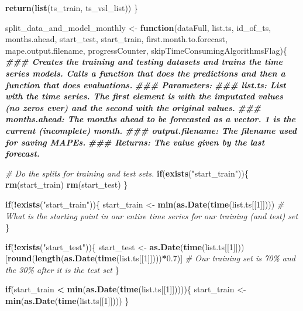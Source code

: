 \documentclass[
]{article}
\newenvironment{Shaded}{\begin{snugshade}}{\end{snugshade}}
\newcommand{\CommentTok}[1]{\textcolor[rgb]{0.56,0.35,0.01}{\textit{#1}}}
\newcommand{\ControlFlowTok}[1]{\textcolor[rgb]{0.13,0.29,0.53}{\textbf{#1}}}
\newcommand{\DecValTok}[1]{\textcolor[rgb]{0.00,0.00,0.81}{#1}}
\newcommand{\DocumentationTok}[1]{\textcolor[rgb]{0.56,0.35,0.01}{\textbf{\textit{#1}}}}
\newcommand{\FloatTok}[1]{\textcolor[rgb]{0.00,0.00,0.81}{#1}}
\newcommand{\FunctionTok}[1]{\textcolor[rgb]{0.13,0.29,0.53}{\textbf{#1}}}
\newcommand{\NormalTok}[1]{#1}
\newcommand{\OtherTok}[1]{\textcolor[rgb]{0.56,0.35,0.01}{#1}}
\newcommand{\SpecialCharTok}[1]{\textcolor[rgb]{0.81,0.36,0.00}{\textbf{#1}}}
\newcommand{\StringTok}[1]{\textcolor[rgb]{0.31,0.60,0.02}{#1}}
\begin{document}
\begin{Shaded}
\begin{Highlighting}[]
  \FunctionTok{return}\NormalTok{(}\FunctionTok{list}\NormalTok{(ts\_train, ts\_vsl\_list))}
\NormalTok{\}}


\NormalTok{split\_data\_and\_model\_monthly }\OtherTok{\textless{}{-}} \ControlFlowTok{function}\NormalTok{(dataFull, list.ts, id\_of\_ts, months.ahead, start\_test, start\_train, first.month.to.forecast, mape.output.filename, progressCounter, skipTimeConsumingAlgorithmsFlag)\{}
\DocumentationTok{\#\#\# Creates the training and testing datasets and trains the time series models. Calls a function that does the predictions and then a function that does evaluations.}
\DocumentationTok{\#\#\# Parameters:}
\DocumentationTok{\#\#\# list.ts: List with the time series. The first element is with the imputated values (no zeros ever) and the second with the original values.}
\DocumentationTok{\#\#\# months.ahead: The months ahead to be forecasted as a vector. 1 is the current (incomplete) month.}
\DocumentationTok{\#\#\# output.filename: The filename used for saving MAPEs.}
\DocumentationTok{\#\#\# Returns: The value given by the last forecast.}

  \CommentTok{\# Do the splits for training and test sets.}
  \ControlFlowTok{if}\NormalTok{(}\FunctionTok{exists}\NormalTok{(}\StringTok{"start\_train"}\NormalTok{))\{}
    \FunctionTok{rm}\NormalTok{(start\_train)}
    \FunctionTok{rm}\NormalTok{(start\_test)}
\NormalTok{  \}}

  \ControlFlowTok{if}\NormalTok{(}\SpecialCharTok{!}\FunctionTok{exists}\NormalTok{(}\StringTok{"start\_train"}\NormalTok{))\{}
\NormalTok{    start\_train }\OtherTok{\textless{}{-}} \FunctionTok{min}\NormalTok{(}\FunctionTok{as.Date}\NormalTok{(}\FunctionTok{time}\NormalTok{(list.ts[[}\DecValTok{1}\NormalTok{]]))) }\CommentTok{\# What is the starting point in our entire time series for our training (and test) set}
\NormalTok{  \}}

  \ControlFlowTok{if}\NormalTok{(}\SpecialCharTok{!}\FunctionTok{exists}\NormalTok{(}\StringTok{"start\_test"}\NormalTok{))\{}
\NormalTok{    start\_test }\OtherTok{\textless{}{-}} \FunctionTok{as.Date}\NormalTok{(}\FunctionTok{time}\NormalTok{(list.ts[[}\DecValTok{1}\NormalTok{]]))[}\FunctionTok{round}\NormalTok{(}\FunctionTok{length}\NormalTok{(}\FunctionTok{as.Date}\NormalTok{(}\FunctionTok{time}\NormalTok{(list.ts[[}\DecValTok{1}\NormalTok{]])))}\SpecialCharTok{*}\FloatTok{0.7}\NormalTok{)] }\CommentTok{\# Our training set is 70\% and the 30\% after it is the test set}
\NormalTok{  \}}
  
  \ControlFlowTok{if}\NormalTok{(start\_train }\SpecialCharTok{\textless{}} \FunctionTok{min}\NormalTok{(}\FunctionTok{as.Date}\NormalTok{(}\FunctionTok{time}\NormalTok{(list.ts[[}\DecValTok{1}\NormalTok{]]))))\{}
\NormalTok{    start\_train }\OtherTok{\textless{}{-}} \FunctionTok{min}\NormalTok{(}\FunctionTok{as.Date}\NormalTok{(}\FunctionTok{time}\NormalTok{(list.ts[[}\DecValTok{1}\NormalTok{]])))}
\NormalTok{  \}}
  

\end{Highlighting}
\end{Shaded}
\end{document}
